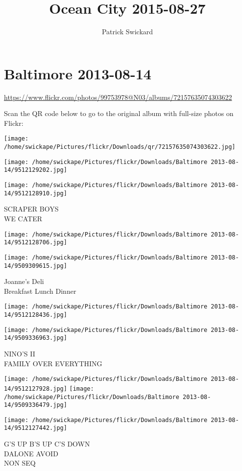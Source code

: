 \documentclass[10pt,letterpaper]{article}
\title{Ocean City 2015-08-27}
\author{Patrick Swickard}
\date{}
\begin{document}
\section*{Baltimore 2013-08-14}

\url{https://www.flickr.com/photos/99753978@N03/albums/72157635074303622}

Scan the QR code below to go to the original album with full-size photos on Flickr:

\texttt{[image: /home/swickape/Pictures/flickr/Downloads/qr/72157635074303622.jpg]}
\pagebreak

\texttt{[image: /home/swickape/Pictures/flickr/Downloads/Baltimore 2013-08-14/9512129202.jpg]}

\vspace{0.25in}
\texttt{[image: /home/swickape/Pictures/flickr/Downloads/Baltimore 2013-08-14/9512128910.jpg]}

SCRAPER BOYS\\
WE CATER
\pagebreak

\texttt{[image: /home/swickape/Pictures/flickr/Downloads/Baltimore 2013-08-14/9512128706.jpg]}

\vspace{0.25in}
\texttt{[image: /home/swickape/Pictures/flickr/Downloads/Baltimore 2013-08-14/9509309615.jpg]}

Joanne's Deli\\
Breakfast Lunch Dinner
\pagebreak

\texttt{[image: /home/swickape/Pictures/flickr/Downloads/Baltimore 2013-08-14/9512128436.jpg]}

\vspace{0.25in}
\texttt{[image: /home/swickape/Pictures/flickr/Downloads/Baltimore 2013-08-14/9509336963.jpg]}

NINO'S II\\
FAMILY OVER EVERYTHING
\pagebreak

\texttt{[image: /home/swickape/Pictures/flickr/Downloads/Baltimore 2013-08-14/9512127928.jpg]}
\texttt{[image: /home/swickape/Pictures/flickr/Downloads/Baltimore 2013-08-14/9509336479.jpg]}

\vspace{0.25in}
\texttt{[image: /home/swickape/Pictures/flickr/Downloads/Baltimore 2013-08-14/9512127442.jpg]}

G'S UP B'S UP C'S DOWN\\
DALONE AVOID\\
NON SEQ
\pagebreak
\end{document}
